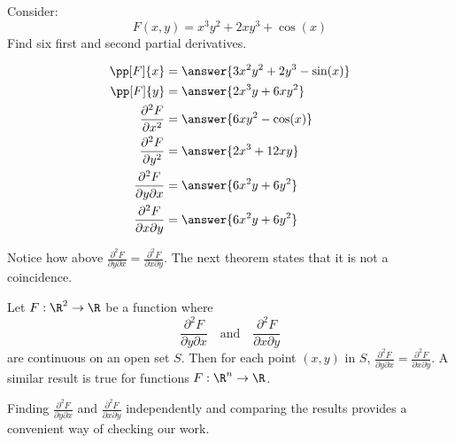 \documentclass{ximera}
\begin{document}
\begin{question}
  Consider:
  \[
  F(x,y) = x^3y^2 + 2xy^3+\cos(x)
  \]
  Find six first and second partial derivatives.
  \begin{prompt}
    \begin{align*}
      \pp[F]{x} &= \answer{3x^2y^2+2y^3-\sin(x)}\\
      \pp[F]{y} &= \answer{2x^3y+6xy^2}\\
      \frac{\partial^2F}{\partial x^2} &= \answer{6xy^2-\cos(x)}\\
      \frac{\partial^2F}{\partial y^2} &= \answer{2x^3+12xy}\\
      \frac{\partial^2F}{\partial y\partial x} &= \answer{6x^2y+6y^2}\\
      \frac{\partial^2F}{\partial x\partial y} &= \answer{6x^2y+6y^2}
    \end{align*}
  \end{prompt}
\end{question}
Notice how above $\frac{\partial^2F}{\partial y\partial
  x}=\frac{\partial^2F}{\partial x\partial y}$. The next theorem states
that it is not a coincidence.

\begin{theorem}
  Let $F:\R^2\to \R$ be a function where
  \[
  \frac{\partial^2F}{\partial y\partial x}\quad\text{and}\quad\frac{\partial^2F}{\partial x\partial y}
  \]
  are continuous on an open set $S$. Then for each point $(x,y)$ in
  $S$, $\frac{\partial^2F}{\partial y\partial
    x}=\frac{\partial^2F}{\partial x\partial y}$.
  A similar result is true for functions $F:\R^n\to \R$.
\end{theorem}

Finding $\frac{\partial^2F}{\partial y\partial x}$ and
$\frac{\partial^2F}{\partial x\partial y}$ independently and comparing
the results provides a convenient way of checking our work.
\end{document}
